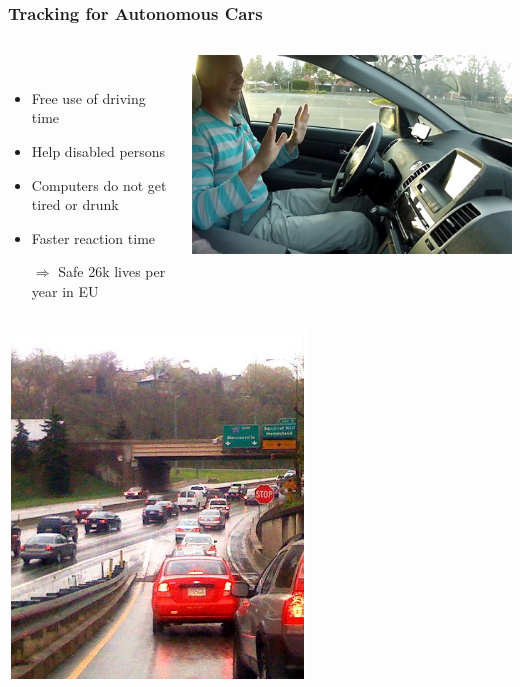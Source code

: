 \begin{frame}
  \frametitle{Tracking for Autonomous Cars}
  
  \begin{columns}
  \begin{column}{0.6\textwidth}
  \begin{description}[]
  \item[Chances] \hfill \\
  \begin{itemize}
  \item Free use of driving time
  \item Help disabled persons
  \item Computers do not get\\tired or drunk
  \item Faster reaction time
  \item[$\Rightarrow$] Safe 26k lives per year in EU
  \end{itemize}
  \end{description}
  \end{column}
  \begin{column}{0.4\textwidth}
  \includegraphics[width=\textwidth]{images/auto.jpg}
  \end{column}
  \end{columns}
  \pause
  \bigskip
  \begin{columns}
  \begin{column}{0.6\textwidth}
  \includegraphics[height=0.35\textheight]{images/highway}

\end{column}
\end{columns}
\end{frame}
